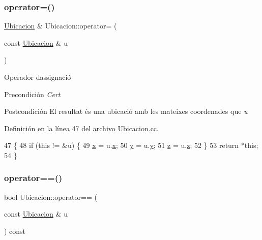 \subsubsection{\texorpdfstring{operator=()}{operator=()}}
{\footnotesize\ttfamily \hyperlink{class_ubicacion}{Ubicacion} \& Ubicacion\+::operator= (\begin{DoxyParamCaption}\item[{const \hyperlink{class_ubicacion}{Ubicacion} \&}]{u }\end{DoxyParamCaption})}



Operador d\textquotesingle{}assignació 

\begin{DoxyPrecond}{Precondición}
{\itshape Cert} 
\end{DoxyPrecond}
\begin{DoxyPostcond}{Postcondición}
El resultat és una ubicació amb les mateixes coordenades que {\itshape u} 
\end{DoxyPostcond}


Definición en la línea 47 del archivo Ubicacion.\+cc.


\begin{DoxyCode}
47                                                   \{
48   \textcolor{keywordflow}{if} (\textcolor{keyword}{this} != &u) \{
49     \hyperlink{class_ubicacion_aa025967df0ca8761587b09a38cf5b798}{x} = u.\hyperlink{class_ubicacion_aa025967df0ca8761587b09a38cf5b798}{x};
50     \hyperlink{class_ubicacion_ab314f05b8da651aabb8a623467919a94}{y} = u.\hyperlink{class_ubicacion_ab314f05b8da651aabb8a623467919a94}{y};
51     \hyperlink{class_ubicacion_ad74770f35bf4b18d3959b78cd90b6eb0}{z} = u.\hyperlink{class_ubicacion_ad74770f35bf4b18d3959b78cd90b6eb0}{z};
52   \}
53   \textcolor{keywordflow}{return} *\textcolor{keyword}{this};
54 \}
\end{DoxyCode}
\mbox{\label{class_ubicacion_a4fd8b3d7d42695cc4852771e34ab63bc}} 
\subsubsection{\texorpdfstring{operator==()}{operator==()}}
{\footnotesize\ttfamily bool Ubicacion\+::operator== (\begin{DoxyParamCaption}\item[{const \hyperlink{class_ubicacion}{Ubicacion} \&}]{u }\end{DoxyParamCaption}) const}



